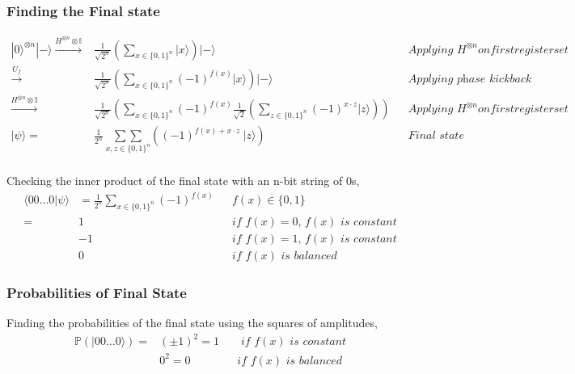 \documentclass{article}
\begin{document}
\subsubsection{Finding the Final state}
\begin{align*}
	|0\rangle^{\otimes n}|-\rangle \xrightarrow{H^{\otimes n} \otimes \mathbb{I}} & \frac{1}{\sqrt{2^n}} \left( \sum_{x \in \{0,1\}^n} |x\rangle \right) |-\rangle                                                                            &  & \textit{Applying $H^{\otimes n} on first register set$} \\
	\xrightarrow{U_f}                                                             & \frac{1}{\sqrt{2^n}} \left( \sum_{x \in \{0,1\}^n} (-1)^{f(x)}|x\rangle \right) |-\rangle                                                                 &  & \textit{Applying phase kickback}                        \\
	\xrightarrow{H^{\otimes n} \otimes \mathbb{I}}                                & \frac{1}{\sqrt{2^n}} \left( \sum_{x \in \{0,1\}^n} (-1)^{f(x)} \frac{1}{\sqrt{2}} \left( \sum_{z \in \{0,1\}^n} (-1)^{x\cdot z} |z\rangle \right) \right) &  & \textit{Applying $H^{\otimes n} on first register set$} \\
	|\psi \rangle=                                                                & \frac{1}{2^n} \ \underset{x,z \in \{0, 1\}^n}{\sum \sum }\left( (-1)^{f(x) + x \cdot z} \ |z\rangle \right)                                               &  & \textit{Final state}                                    \\
\end{align*}

Checking the inner product of the final state with an n-bit string of $0$s,
\begin{align*}
	\langle 00 \hdots 0 | \psi \rangle & = \frac{1}{2^n} \sum_{x \in \{0, 1\}^n} (-1)^{f(x)} &  & f(x) \in \{0, 1\}                        \\
	=                                  & 1                                                   &  & \textit{if $f(x)=0$, $f(x)$ is constant} \\
	                                   & -1                                                  &  & \textit{if $f(x)=1$, $f(x)$ is constant} \\
	                                   & 0                                                   &  & \textit{if $f(x)$ is balanced}
\end{align*}

\subsubsection{Probabilities of Final State}
Finding the probabilities of the final state using the squares of amplitudes,
\begin{align*}
	\mathds{P}(|00\hdots 0\rangle) = & (\pm 1)^2 = 1 &  & \textit{ if $f(x)$ is constant} \\
	                                 & 0^2 = 0       &  & \textit{if $f(x)$ is balanced}
\end{align*}
\end{document}
